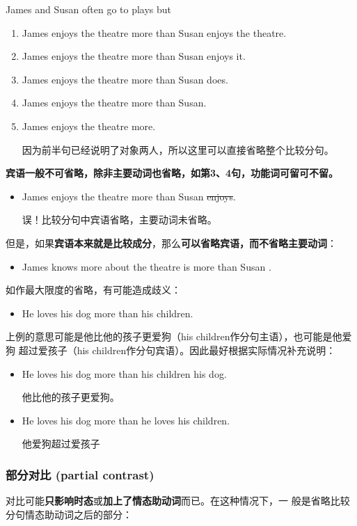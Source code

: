 James and Susan often go to plays but
\begin{enumerate}
\item James enjoys the theatre more than Susan enjoys the theatre.
\item James enjoys the theatre more than Susan enjoys it.
\item James enjoys the theatre more than Susan does.
\item James enjoys the theatre more than Susan.
\item James enjoys the theatre more.

  因为前半句已经说明了对象两人，所以这里可以直接省略整个比较分句。
\end{enumerate}
\textbf{宾语一般不可省略，除非主要动词也省略，如第3、4句，功能词可留可不留。}
\begin{itemize}
\item James enjoys the theatre more than Susan \sout{enjoys}.

  误！比较分句中宾语省略，主要动词未省略。
\end{itemize}
但是，如果\textbf{宾语本来就是比较成分}，那么\textbf{可以省略宾语，而不省略主要动词}：
\begin{itemize}
\item James knows more about the theatre is more than Susan .
\end{itemize}


如作最大限度的省略，有可能造成歧义：
\begin{itemize}
\item He loves his dog more than his children.
\end{itemize}
上例的意思可能是他比他的孩子更爱狗（his children作分句主语），也可能是他爱狗
超过爱孩子（his children作分句宾语）。因此最好根据实际情况补充说明：
\begin{itemize}
\item He loves his dog more than his children  his dog.

  他比他的孩子更爱狗。
\item He loves his dog more than he loves his children.

  他爱狗超过爱孩子
\end{itemize}


\subsubsection{部分对比 (partial contrast)}

对比可能\textbf{只影响时态}或\textbf{加上了情态助动词}而已。在这种情况下，一
般是省略比较分句情态助动词之后的部分：

